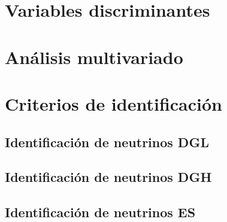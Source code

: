 	
	\section{Variables discriminantes}
	
	\section{Análisis multivariado}
	
	\section{Criterios de identificación}
	
		\subsection{Identificación de neutrinos DGL}
		
		\subsection{Identificación de neutrinos DGH}
		
		\subsection{Identificación de neutrinos ES}
	
